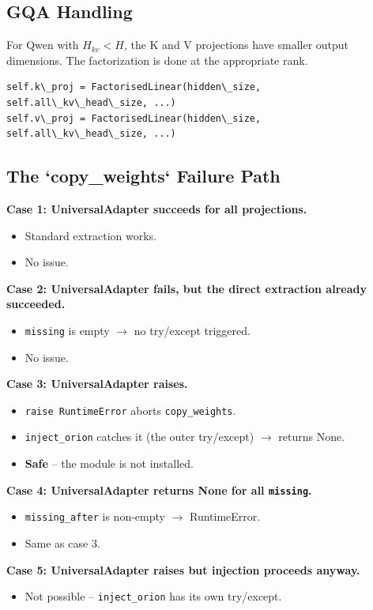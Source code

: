\subsection{GQA Handling}

For Qwen with $H_{kv} < H$, the K and V projections have smaller output 
dimensions. The factorization is done at the appropriate rank.

\begin{lstlisting}
self.k\_proj = FactorisedLinear(hidden\_size, self.all\_kv\_head\_size, ...)
self.v\_proj = FactorisedLinear(hidden\_size, self.all\_kv\_head\_size, ...)
\end{lstlisting}

\subsection{The `copy\_weights` Failure Path}

\textbf{Case 1: UniversalAdapter succeeds for all projections.}
\begin{itemize}
\item Standard extraction works.
\item No issue.

\end{itemize}
\textbf{Case 2: UniversalAdapter fails, but the direct extraction already succeeded.}
\begin{itemize}
\item \texttt{missing} is empty $\to$ no try/except triggered.
\item No issue.

\end{itemize}
\textbf{Case 3: UniversalAdapter raises.}
\begin{itemize}
\item \texttt{raise RuntimeError} aborts \texttt{copy\_weights}.
\item \texttt{inject\_orion} catches it (the outer try/except) $\to$ returns None.
\item \textbf{Safe} -- the module is not installed.

\end{itemize}
\textbf{Case 4: UniversalAdapter returns None for all \texttt{missing}.}
\begin{itemize}
\item \texttt{missing\_after} is non-empty $\to$ RuntimeError.
\item Same as case 3.

\end{itemize}
\textbf{Case 5: UniversalAdapter raises but injection proceeds anyway.}
\begin{itemize}
\item Not possible -- \texttt{inject\_orion} has its own try/except.

\end{itemize}
